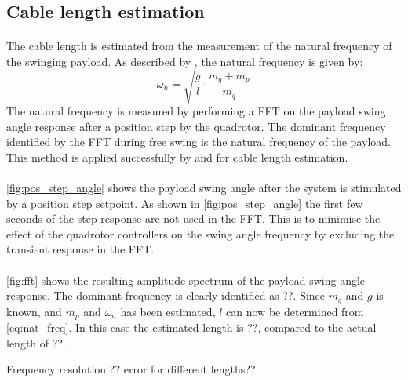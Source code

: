 \subsection{Cable length estimation} \label{sec:length_estimation}

    \paragraph{}
    The cable length is estimated from the measurement of the natural frequency of the swinging payload.
    As described by
    \cite{bisgaard},
    the natural frequency is given by:
    \begin{equation} \label{eq:nat_freq}
        \omega_n = \sqrt{ \frac{g}{l} \cdot \frac{m_q + m_p}{m_q}}
    \end{equation}
    The natural frequency is measured by performing a FFT on the payload swing angle response 
    after a position step by the quadrotor.
    The dominant frequency identified by the FFT during free swing is the natural frequency of the payload.
    This method is applied successfully by \cite{Erasmus2020} and \cite{Slabber2020} for cable length estimation.
    
    \paragraph{}
    \ref{fig:pos_step_angle}
    shows the payload swing angle after the system is stimulated by a position step setpoint.
    As shown in 
    \ref{fig:pos_step_angle}
    the first few seconds of the step response are not used in the FFT.
    This is to minimise the effect of the quadrotor controllers on the swing angle frequency 
    by excluding the transient response in the FFT.

    \paragraph{}
    \ref{fig:fft} 
    shows the resulting amplitude spectrum of the payload swing angle response.
    The dominant frequency is clearly identified as ??.
    Since $m_q$ and $g$ is known, and $m_p$ and $\omega_n$ has been estimated, $l$ can now be determined from
    \ref{eq:nat_freq}.
    In this case the estimated length is ??, compared to the actual length of ??.
    
    Frequency resolution ??
    error for different lengths??

